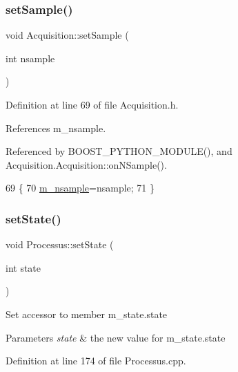 \subsubsection{\texorpdfstring{set\+Sample()}{setSample()}\hspace{0.1cm}{\footnotesize\ttfamily [2/2]}}
{\footnotesize\ttfamily void Acquisition\+::set\+Sample (\begin{DoxyParamCaption}\item[{int}]{nsample }\end{DoxyParamCaption})\hspace{0.3cm}{\ttfamily [inline]}}



Definition at line 69 of file Acquisition.\+h.



References m\+\_\+nsample.



Referenced by B\+O\+O\+S\+T\+\_\+\+P\+Y\+T\+H\+O\+N\+\_\+\+M\+O\+D\+U\+L\+E(), and Acquisition.\+Acquisition\+::on\+N\+Sample().


\begin{DoxyCode}
69                              \{
70     \hyperlink{classAcquisition_a26d0f1a44309ffac49c365b7ee568ab2}{m\_nsample}=nsample;
71   \}
\end{DoxyCode}
\mbox{\label{classProcessus_ad38cde0f1bcefa00b068e7947b8af927}} 
\subsubsection{\texorpdfstring{set\+State()}{setState()}}
{\footnotesize\ttfamily void Processus\+::set\+State (\begin{DoxyParamCaption}\item[{int}]{state }\end{DoxyParamCaption})\hspace{0.3cm}{\ttfamily [inherited]}}

Set accessor to member m\+\_\+state.\+state 
\begin{DoxyParams}{Parameters}
{\em state} & the new value for m\+\_\+state.\+state \\
\hline
\end{DoxyParams}


Definition at line 174 of file Processus.\+cpp.



